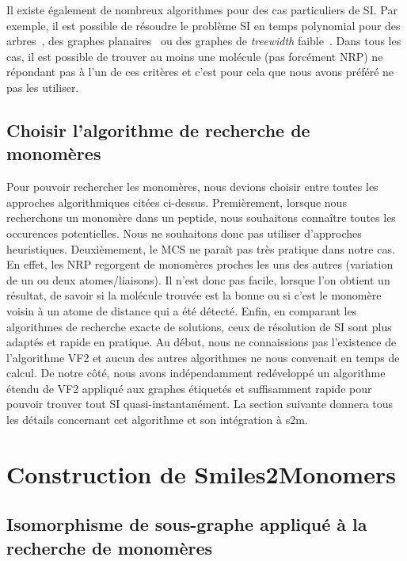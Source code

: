 Il existe également de nombreux algorithmes pour des cas particuliers de SI.
Par exemple, il est possible de résoudre le problème SI en temps polynomial pour des arbres~\cite{shamir_faster_1997}, des graphes planaires~\cite{eppstein_subgraph_1995,dorn_planar_2009} ou des graphes de \textit{treewidth} faible~\cite{hajiaghayi_subgraph_2007}.
Dans tous les cas, il est possible de trouver au moins une molécule (pas forcément NRP) ne répondant pas à l'un de ces critères et c'est pour cela que nous avons préféré ne pas les utiliser.


\subsection{Choisir l'algorithme de recherche de monomères}

Pour pouvoir rechercher les monomères, nous devions choisir entre toutes les approches algorithmiques citées ci-dessus.
Premièrement, lorsque nous recherchons un monomère dans un peptide, nous souhaitons connaître toutes les occurences potentielles.
Nous ne souhaitons donc pas utiliser d'approches heuristiques.
Deuxièmement, le MCS ne paraît pas très pratique dans notre cas.
En effet, les NRP regorgent de monomères proches les uns des autres (variation de un ou deux atomes/liaisons).
Il n'est donc pas facile, lorsque l'on obtient un résultat, de savoir si la molécule trouvée est la bonne ou si c'est le monomère voisin à un atome de distance qui a été détecté.
Enfin, en comparant les algorithmes de recherche exacte de solutions, ceux de résolution de SI sont plus adaptés et rapide en pratique.
Au début, nous ne connaissions pas l'existence de l'algorithme VF2 et aucun des autres algorithmes ne nous convenait en temps de calcul.
De notre côté, nous avons indépendamment redéveloppé un algorithme étendu de VF2 appliqué aux graphes étiquetés et suffisamment rapide pour pouvoir trouver tout SI quasi-instantanément.
La section suivante donnera tous les détails concernant cet algorithme et son intégration à s2m.




\section{Construction de Smiles2Monomers}

\label{algos_s2m}

\subsection{Isomorphisme de sous-graphe appliqué à la recherche de monomères}

